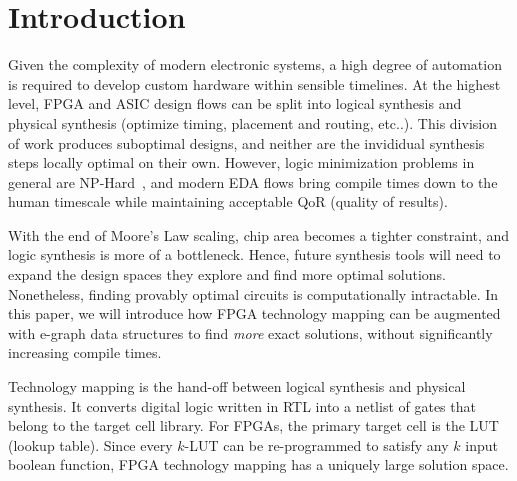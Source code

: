 \section{Introduction}\label{sec:intro}
Given the complexity of modern electronic systems, a high degree of automation
is required to develop custom hardware within sensible timelines. At the
highest level, FPGA and ASIC design flows can be split into logical synthesis
and physical synthesis (optimize timing, placement and routing, etc..). This
division of work produces suboptimal designs, and neither are the invididual
synthesis steps locally optimal on their own. However, logic minimization
problems in general are NP-Hard~, and modern EDA flows bring compile
times down to the human timescale while maintaining acceptable QoR (quality of
results).

With the end of Moore's Law scaling, chip area becomes a tighter constraint,
and logic synthesis is more of a bottleneck. Hence, future synthesis tools will
need to expand the design spaces they explore and find more optimal solutions.
Nonetheless, finding provably optimal circuits is computationally intractable.
In this paper, we will introduce how FPGA technology mapping can be augmented
with e-graph data structures to find \textit{more} exact solutions, without
significantly increasing compile times.

Technology mapping is the hand-off between logical synthesis and physical
synthesis. It converts digital logic written in RTL into a netlist of gates
that belong to the target cell library. For FPGAs, the primary target cell is
the LUT (lookup table). Since every $k$-LUT can be re-programmed to satisfy any
$k$ input boolean function, FPGA technology mapping has a uniquely large
solution space. 